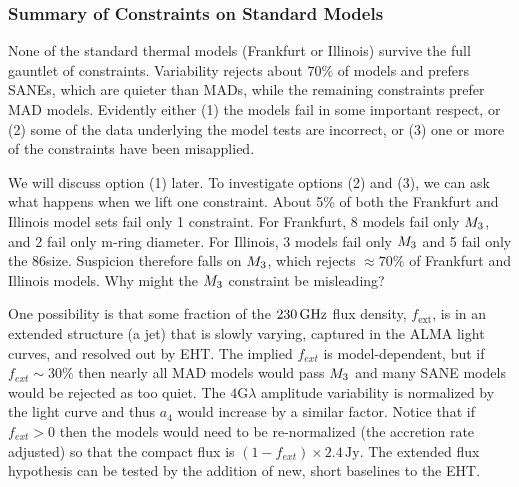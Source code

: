 
\subsubsection{Summary of Constraints on Standard Models}

None of the standard thermal models (Frankfurt or Illinois) survive the full gauntlet of constraints.   Variability rejects about $70\%$ of models and prefers SANEs, which are quieter than MADs, while the remaining constraints prefer MAD models.
Evidently either (1) the models fail in some important respect, or (2) some of the data underlying the model tests are incorrect, or (3) one or more of the constraints have been misapplied.

We will discuss option (1) later.  To investigate options (2) and (3), we can ask what happens when we lift one constraint.  About 5\% of both the Frankfurt and Illinois model sets fail only 1 constraint.  For Frankfurt, 8 models fail only $M_{3}$, and 2 fail only m-ring diameter.  For Illinois, 3 models fail only $M_{3}$ and 5 fail only the 86\GHz size.  Suspicion therefore falls on $M_{3}$, which rejects $\approx 70\%$ of Frankfurt and Illinois models.  Why might the $M_{3}$ constraint be misleading?

One possibility is that some fraction of the $230\,\mathrm{GHz}$ flux density, $f_\mathrm{ext}$, is in an extended structure (a jet) that is slowly varying, captured in the ALMA light curves, and resolved out by EHT.  The implied $f_{ext}$ is model-dependent, but if $f_{ext} \sim 30\%$ then nearly all MAD models would pass $M_{3}$ and many SANE models would be rejected as too quiet.  The $4$G$\lambda$ amplitude variability is normalized by the light curve and thus $a_4$ would increase by a similar factor.  Notice that if $f_{ext} > 0$ then the models would need to be re-normalized (the accretion rate adjusted) so that the compact flux is $(1 - f_{ext}) \times 2.4\,\mathrm{Jy}$.  The extended flux hypothesis can be tested by the addition of new, short baselines to the EHT.

